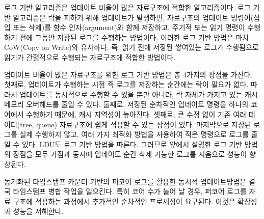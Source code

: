 
로그 기반 알고리즘은 업데이트 비율이 많은 자료구조에 적합한 알고리즘이다. 
로그 기반 알고리즘은 락을 피하기 위해 업데이트가 발생하면, 자료구조의 업데이트 
명령어(삽입 또는 삭제)를 함수 인자(argument)와 함께 저장하고, 주기적 또는 읽기 명령이
 수행하기 전에 그동안 저장된 로그를 수행하는 방법이다.
이러한 로그 기반 방법은 마치 CoW(Copy on Write)와 유사하다.
즉, 읽기 전에 저장된 쌓여있는 로그가 수행됨으로 읽기가 간혈적으로 수행되는 자료구조에 적합한 방법이다.

업데이트 비율이 많은 자료구조를 위한 로그 기반 방법은 총 4가지의 장점을 가진다. 
첫째로, 업데이트가 수행하는 시점 즉 로그를 저장하는 순간에는 락이 필요가 없다. 
따라서 업데이트를 동시적으로 수행할 수 있을 뿐만 아니라, 락 자체가 가지고 있는 캐시 메모리 오버헤드를 
줄일 수 있다. 
둘째로, 저장된 순차적인 업데이트 명령을 하나의 코어에서 수행하기 때문에, 캐시 지역성이 높아진다.
셋째로, 큰 수정 없이 기존 여러 데이터(tree, queue) 자료구조에 쉽게 적용할 수 있는 장점이 있다.
마지막으로 저장된 로그를 실제 수행하지 않고, 여러 가지 최적화 방법을 사용하여 적은 
명령으로 로그를 줄일 수 있다. 
LDU도 로그 기반 방법을 따른다. 그러므로 앞에서 설명한 로그 기반 방법의 장점을 모두 가짐과 동시에
업데이트 순간 삭제 가능한 로그를 지움으로 성능이 향상된다.


동기화된 타임스탬프 카운터 기반의 퍼코어 로그를 활용한 동시적 업데이트방법은 결국 타임스탬프 병합 작업을 일으킨다.
특히 코어 수가 늘어 날 경우, 퍼코어 로그를 자료 구조에 적용하는 과정에서 추가적인 
순차적인 프로세싱이 요구된다.
이것은 확장성과 성능을 저해한다. 

